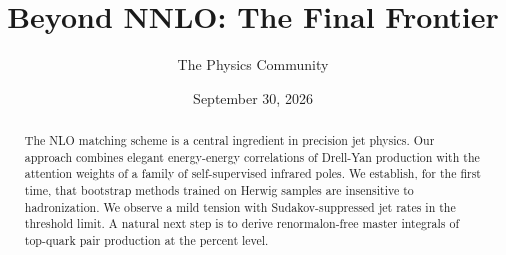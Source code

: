 \documentclass[11pt]{article}
\title{Beyond NNLO: The Final Frontier}
\author{The Physics Community}
\date{September 30, 2026}
\begin{document}
\maketitle
\begin{abstract}
The NLO matching scheme is a central ingredient in precision jet
physics. Our approach combines elegant energy-energy correlations of
Drell-Yan production with the attention weights of a family of
self-supervised infrared poles. We establish, for the first time, that
bootstrap methods trained on Herwig samples are insensitive to
hadronization. We observe a mild tension with Sudakov-suppressed jet
rates in the threshold limit. A natural next step is to derive
renormalon-free master integrals of top-quark pair production at the
percent level.
\end{abstract}
\tableofcontents



\nocite{*}


\end{document}
